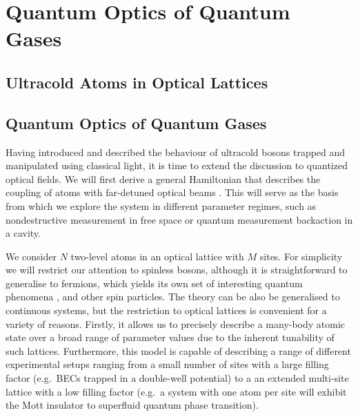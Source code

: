 
\chapter{Quantum Optics of Quantum Gases}  

\ifpdf
    \graphicspath{{Chapter2/Figs/Raster/}{Chapter2/Figs/PDF/}{Chapter2/Figs/}}
\else
    \graphicspath{{Chapter2/Figs/Vector/}{Chapter2/Figs/}}
\fi



\section{Ultracold Atoms in Optical Lattices}


\section{Quantum Optics of Quantum Gases}

Having introduced and described the behaviour of ultracold bosons
trapped and manipulated using classical light, it is time to extend
the discussion to quantized optical fields. We will first derive a
general Hamiltonian that describes the coupling of atoms with
far-detuned optical beams \cite{mekhov2012}. This will serve as the
basis from which we explore the system in different parameter regimes,
such as nondestructive measurement in free space or quantum
measurement backaction in a cavity.

We consider $N$ two-level atoms in an optical lattice with $M$
sites. For simplicity we will restrict our attention to spinless
bosons, although it is straightforward to generalise to fermions,
which yields its own set of interesting quantum phenomena
\cite{atoms2015, mazzucchi2016, mazzucchi2016af}, and other spin
particles. The theory can be also be generalised to continuous
systems, but the restriction to optical lattices is convenient for a
variety of reasons. Firstly, it allows us to precisely describe a
many-body atomic state over a broad range of parameter values due to
the inherent tunability of such lattices. Furthermore, this model is
capable of describing a range of different experimental setups ranging
from a small number of sites with a large filling factor (e.g.~BECs
trapped in a double-well potential) to a an extended multi-site
lattice with a low filling factor (e.g.~a system with one atom per
site will exhibit the Mott insulator to superfluid quantum phase
transition). 



